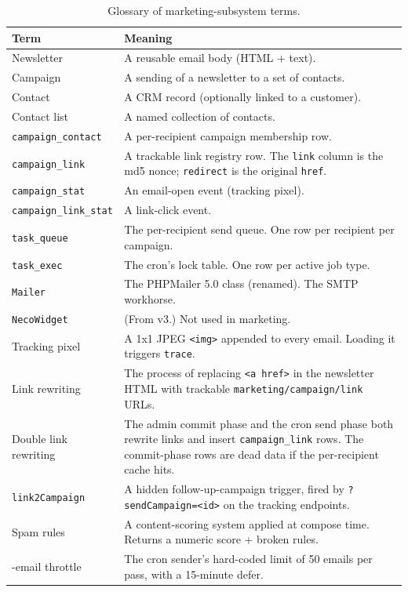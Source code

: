 \documentclass[11pt,a4paper]{article}
\begin{document}
\begin{table}[htbp]
\centering
\caption{Glossary of marketing-subsystem terms.}\label{tab:glossary-v4}
\footnotesize\sloppy
\begin{tabularx}{\columnwidth}{>{\raggedright\arraybackslash}p{3.6cm}X}
\toprule
\textbf{Term} & \textbf{Meaning} \\
\midrule
Newsletter & A reusable email body (HTML + text). \\
Campaign & A sending of a newsletter to a set of contacts. \\
Contact & A CRM record (optionally linked to a customer). \\
Contact list & A named collection of contacts. \\
\texttt{campaign\_contact} & A per-recipient campaign membership row. \\
\texttt{campaign\_link} & A trackable link registry row. The \texttt{link} column is the md5 nonce; \texttt{redirect} is the original \texttt{href}. \\
\texttt{campaign\_stat} & An email-open event (tracking pixel). \\
\texttt{campaign\_link\_stat} & A link-click event. \\
\texttt{task\_queue} & The per-recipient send queue. One row per recipient per campaign. \\
\texttt{task\_exec} & The cron's lock table. One row per active job type. \\
\texttt{Mailer} & The PHPMailer 5.0 class (renamed). The SMTP workhorse. \\
\texttt{NecoWidget} & (From v3.) Not used in marketing. \\
Tracking pixel & A 1x1 JPEG \texttt{<img>} appended to every email. Loading it triggers \texttt{trace}. \\
Link rewriting & The process of replacing \texttt{<a href>} in the newsletter HTML with trackable \texttt{marketing/campaign/link} URLs. \\
Double link rewriting & The admin commit phase and the cron send phase both rewrite links and insert \texttt{campaign\_link} rows. The commit-phase rows are dead data if the per-recipient cache hits. \\
\texttt{link2Campaign} & A hidden follow-up-campaign trigger, fired by \texttt{?sendCampaign=<id>} on the tracking endpoints. \\
Spam rules & A content-scoring system applied at compose time. Returns a numeric score + broken rules. \\
50-email throttle & The cron sender's hard-coded limit of 50 emails per pass, with a 15-minute defer. \\
\bottomrule
\end{tabularx}
\end{table}
\end{document}
